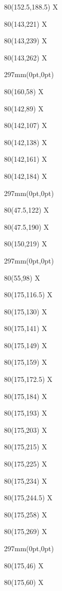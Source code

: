 \documentclass[a4paper]{article}
\newcommand{\text}[4]{\begin{textblock}{#3}(#2,#1)
{\large #4}
\end{textblock}}
\newcommand{\insertpage}[1]{\begin{textblock*}{297mm}(0pt,0pt)%
	\end{textblock*}%
}
\begin{document}
	\text{188.5}{152.5}{80}{\Large X}
	
	\text{221}{143}{80}{\Large X}
	\text{239}{143}{80}{\Large X}
	\text{262}{143}{80}{\Large X}
	
	\newpage
	\insertpage{5}
	\text{58}{160}{80}{\Large X}
	
	\text{89}{142}{80}{\Large X}
	\text{107}{142}{80}{\Large X}
	\text{138}{142}{80}{\Large X}
	\text{161}{142}{80}{\Large X}
	\text{184}{142}{80}{\Large X}
	
	\newpage
	\insertpage{6}
	\text{122}{47.5}{80}{\Large X}
	\text{190}{47.5}{80}{\Large X}
	\text{219}{150}{80}{\Large X}
	
	\newpage
	\insertpage{7}
	\text{98}{55}{80}{\Large X}
	
	\text{116.5}{175}{80}{\Large X}
	\text{130}{175}{80}{\Large X}
	\text{141}{175}{80}{\Large X}
	\text{149}{175}{80}{\Large X}
	\text{159}{175}{80}{\Large X}
	\text{172.5}{175}{80}{\Large X}
	\text{184}{175}{80}{\Large X}
	\text{193}{175}{80}{\Large X}
	\text{203}{175}{80}{\Large X}
	\text{215}{175}{80}{\Large X}
	\text{225}{175}{80}{\Large X}
	\text{234}{175}{80}{\Large X}
	\text{244.5}{175}{80}{\Large X}
	\text{258}{175}{80}{\Large X}
	\text{269}{175}{80}{\Large X}
	
	\newpage
	\insertpage{8}
	\text{46}{175}{80}{\Large X}
	\text{60}{175}{80}{\Large X}
	
\end{document}
